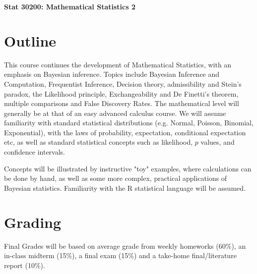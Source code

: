 \def\E{\mbox{E}}
\def\P{\mbox{P}}
\def\ni{\noindent}

\textwidth=18.0cm
\topmargin=-1.2cm
\columnsep=1.0cm
\textheight=21.8cm
\hoffset=-3.2cm
\renewcommand\refname{Recommended Reading}







\begin{center}
\Large\bf Stat 30200: Mathematical Statistics 2\end{center}
\vskip 6mm
\normalsize



\nocite{berger:1985}
\nocite{lindley:2006}
\nocite{bernardo94}
\nocite{berger1988likelihood}
\nocite{savage1970reading}
\nocite{savage1972foundations}
\nocite{sellke2001calibration}
\nocite{berger1987testing}
\nocite{edwards1963bayesian}

\section{Outline}

This course continues the development of Mathematical Statistics, with an emphasis
on Bayesian inference. Topics include Bayesian Inference and Computation, Frequentist Inference, Decision theory, admissibility and Stein's paradox, the Likelihood principle, Exchangeability and De Finetti's theorem, multiple comparisons and False Discovery Rates.
The mathematical level will generally be at that of an easy advanced calculus course.
We will assume familiarity with
standard statistical distributions (e.g. Normal, Poisson, Binomial, Exponential),
with the laws of probability, expectation, conditional expectation etc, as well as standard statistical
concepts such as likelihood,
$p$ values, and confidence intervals.

Concepts will be illustrated  by instructive "toy" examples, where
calculations can be done by hand, as well as some more
complex, practical applications
of Bayesian statistics. Familiarity with the R statistical language will be assumed.


\section{Grading}

Final Grades will be based on average grade from weekly homeworks (60\%),
an in-class midterm (15\%), a final exam (15\%) 
and a take-home final/literature report (10\%). 

